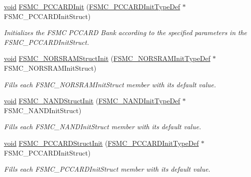 \begin{DoxyCompactItemize}
\hyperlink{usb__devapi_8h_afabf60e7f57651d6d595a02c75f07cd0}{void} \hyperlink{group___f_s_m_c___exported___functions_gacee1351363e7700a296faa1734a910aa}{F\+S\+M\+C\+\_\+\+P\+C\+C\+A\+R\+D\+Init} (\hyperlink{struct_f_s_m_c___p_c_c_a_r_d_init_type_def}{F\+S\+M\+C\+\_\+\+P\+C\+C\+A\+R\+D\+Init\+Type\+Def} $\ast$F\+S\+M\+C\+\_\+\+P\+C\+C\+A\+R\+D\+Init\+Struct)
\begin{DoxyCompactList}\small\item\em Initializes the F\+S\+MC P\+C\+C\+A\+RD Bank according to the specified parameters in the F\+S\+M\+C\+\_\+\+P\+C\+C\+A\+R\+D\+Init\+Struct. \end{DoxyCompactList}\item 
\hyperlink{usb__devapi_8h_afabf60e7f57651d6d595a02c75f07cd0}{void} \hyperlink{group___f_s_m_c___exported___functions_gaf33e6dfc34f62d16a0cb416de9e83d28}{F\+S\+M\+C\+\_\+\+N\+O\+R\+S\+R\+A\+M\+Struct\+Init} (\hyperlink{struct_f_s_m_c___n_o_r_s_r_a_m_init_type_def}{F\+S\+M\+C\+\_\+\+N\+O\+R\+S\+R\+A\+M\+Init\+Type\+Def} $\ast$F\+S\+M\+C\+\_\+\+N\+O\+R\+S\+R\+A\+M\+Init\+Struct)
\begin{DoxyCompactList}\small\item\em Fills each F\+S\+M\+C\+\_\+\+N\+O\+R\+S\+R\+A\+M\+Init\+Struct member with its default value. \end{DoxyCompactList}\item 
\hyperlink{usb__devapi_8h_afabf60e7f57651d6d595a02c75f07cd0}{void} \hyperlink{group___f_s_m_c___exported___functions_ga8283ad94ad8e83d49d5b77d1c7e17862}{F\+S\+M\+C\+\_\+\+N\+A\+N\+D\+Struct\+Init} (\hyperlink{struct_f_s_m_c___n_a_n_d_init_type_def}{F\+S\+M\+C\+\_\+\+N\+A\+N\+D\+Init\+Type\+Def} $\ast$F\+S\+M\+C\+\_\+\+N\+A\+N\+D\+Init\+Struct)
\begin{DoxyCompactList}\small\item\em Fills each F\+S\+M\+C\+\_\+\+N\+A\+N\+D\+Init\+Struct member with its default value. \end{DoxyCompactList}\item 
\hyperlink{usb__devapi_8h_afabf60e7f57651d6d595a02c75f07cd0}{void} \hyperlink{group___f_s_m_c___exported___functions_ga7a64ba0e0545b3f1913c9d1d28c05e62}{F\+S\+M\+C\+\_\+\+P\+C\+C\+A\+R\+D\+Struct\+Init} (\hyperlink{struct_f_s_m_c___p_c_c_a_r_d_init_type_def}{F\+S\+M\+C\+\_\+\+P\+C\+C\+A\+R\+D\+Init\+Type\+Def} $\ast$F\+S\+M\+C\+\_\+\+P\+C\+C\+A\+R\+D\+Init\+Struct)
\begin{DoxyCompactList}\small\item\em Fills each F\+S\+M\+C\+\_\+\+P\+C\+C\+A\+R\+D\+Init\+Struct member with its default value. \end{DoxyCompactList}\item 

\end{DoxyCompactItemize}
